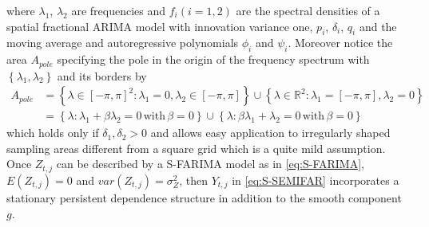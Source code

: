 \documentclass[12pt]{article}
\begin{document}
where \( \lambda_1 \), \( \lambda_2 \) are frequencies and \(f_i (i=1,2)\) are the spectral densities of a spatial fractional ARIMA model with innovation variance one, \(p_i\), \(\delta_i\), \(q_i\) and the moving average and autoregressive polynomials \(\phi_i\) and \(\psi_i \). 
Moreover notice the area \(A_{pole}\) specifying the pole in the origin of the frequency spectrum with \(\left\lbrace \lambda_1,\lambda_2 \right\rbrace \) and its borders by
\begin{equation}
\begin{split}
A_{pole} & = \left\lbrace \lambda \in \left[-\pi,\pi\right]^{2} : \lambda_1 = 0, \lambda_2 \in \left[-\pi,\pi\right] \right\rbrace  \cup \left\lbrace \lambda \in \mathbb{R}^{2} : \lambda_1 = \left[-\pi,\pi\right], \lambda_2 = 0 \right\rbrace \\
& = \left\lbrace \lambda : \lambda_1 + \beta\lambda_2=0 \,\text{with}\, \beta = 0\right\rbrace  \cup \left\lbrace \lambda : \beta\lambda_1 + \lambda_2 = 0 \,\text{with}\, \beta = 0\right\rbrace
\end{split}
\end{equation}
which holds only if \( \delta_1,\delta_2 > 0 \) and allows easy application to irregularly shaped sampling areas different from a square grid which is a quite mild assumption. 
Once \(Z_{t,j}\) can be described by a S-FARIMA model as in \eqref{eq:S-FARIMA}, \(E(Z_{t,j})=0\) and \(var(Z_{t,j}) = \sigma_{Z}^{2} \), then \(Y_{t,j}\) in \eqref{eq:S-SEMIFAR} incorporates a stationary persistent dependence structure in addition to the smooth component \(g\).  
\end{document}
